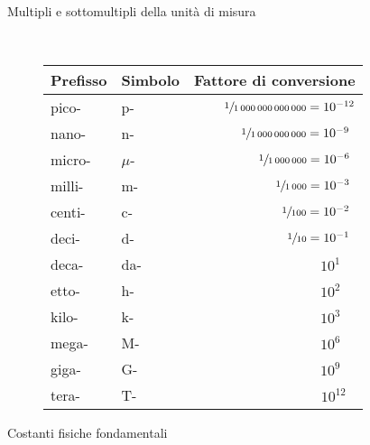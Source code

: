 \documentclass[a4paper,11pt,italian]{article}
\begin{document}
\begin{description}
  \item[Multipli e sottomultipli della unità di misura] ~%
  \begin{table}[h]\centering
    \begin{tabular}{llr}\toprule
      \textbf{Prefisso} & \textbf{Simbolo} & \textbf{Fattore di conversione} \\\midrule
      pico- & p- & $ \sfrac{1}{1\,000\,000\,000\,000} = 10^{-12} $\\\addlinespace[.2em]
      nano- & n- & $ \sfrac{1}{1\,000\,000\,000} = 10^{-9} \:\, $\\\addlinespace[.2em]
      micro- & $ \mu $- & $ \sfrac{1}{1\,000\,000} = 10^{-6} \:\, $\\\addlinespace[.2em]
      milli- & m- & $ \sfrac{1}{1\,000} = 10^{-3} \:\, $\\\addlinespace[.2em]
      centi- & c- & $ \sfrac{1}{100} = 10^{-2} \:\, $\\\addlinespace[.2em]
      deci- & d- & $ \sfrac{1}{10} = 10^{-1} \:\, $\\\addlinespace[.2em]
      deca- & da- & $ 10^{1} \;\;\;\, $\\\addlinespace[.2em]
      etto- & h- & $ 10^{2} \;\;\;\, $\\\addlinespace[.2em]
      kilo- & k- & $ 10^{3} \;\;\;\, $\\\addlinespace[.2em]
      mega- & M- & $ 10^{6} \;\;\;\, $\\\addlinespace[.2em]
      giga- & G- & $ 10^{9} \;\;\;\, $\\\addlinespace[.2em]
      tera- & T- & $ 10^{12} \:\:\, $\\\bottomrule
    \end{tabular}
  \end{table}
  

  
  \item[Costanti fisiche fondamentali] ~
  

\end{description}
\end{document}
